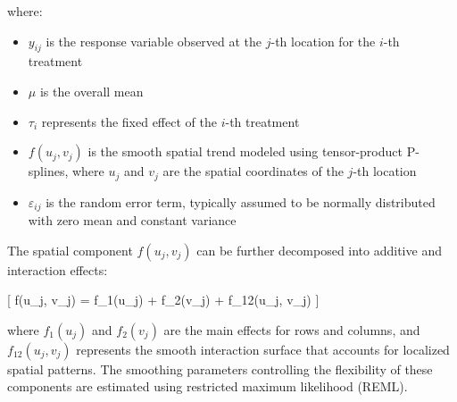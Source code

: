 \documentclass[12pt,a4paper,oneside]{report}
\begin{document}
where: 
\begin{itemize} 
    \item $y_{ij}$ is the response variable observed at the $j$-th location for the $i$-th treatment 
    \item $\mu$ is the overall mean \item $\tau_i$ represents the fixed effect of the $i$-th treatment 
    \item $f(u_j, v_j)$ is the smooth spatial trend modeled using tensor-product P-splines, where $u_j$ and $v_j$ are the spatial coordinates of the $j$-th location 
    \item $\varepsilon_{ij}$ is the random error term, typically assumed to be normally distributed with zero mean and constant variance 
\end{itemize}

The spatial component $f(u_j, v_j)$ can be further decomposed into additive and 
interaction effects: 

[ f(u_j, v_j) = f_1(u_j) + f_2(v_j) + f_{12}(u_j, v_j) ]

where $f_1(u_j)$ and $f_2(v_j)$ are the main effects for rows and columns, 
and $f_{12}(u_j, v_j)$ represents the smooth interaction surface that accounts 
for localized spatial patterns. The smoothing parameters controlling the flexibility 
of these components are estimated using restricted maximum likelihood (REML).
\end{document}
